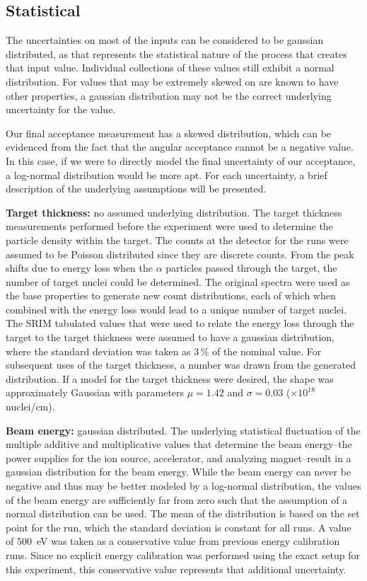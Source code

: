 \subsection{Statistical}

The uncertainties on most of the inputs can be considered to be gaussian
distributed, as that represents the statistical nature of the process
that creates that input value. Individual collections of these values
still exhibit a normal distribution. For values that may be extremely
skewed on are known to have other properties, a gaussian distribution
may not be the correct underlying uncertainty for the value.

Our final acceptance measurement has a skewed distribution, which can be
evidenced from the fact that the angular acceptance cannot be a negative
value. In this case, if we were to directly model the final uncertainty
of our acceptance, a log-normal distribution would be more apt. For each
uncertainty, a brief description of the underlying assumptions will be
presented.

\textbf{Target thickness:} no assumed underlying distribution. The
target thickness measurements performed before the experiment were used
to determine the particle density within the target. The counts at the
detector for the runs were assumed to be Poisson distributed since they
are discrete counts. From the peak shifts due to energy loss when the
$\alpha$ particles passed through the target, the number of target
nuclei could be determined. The original spectra were used as the base
properties to generate new count distributions, each of which when
combined with the energy loss would lead to a unique number of target
nuclei. The SRIM tabulated values that were used to relate the energy
loss through the target to the target thickness were assumed to have a
gaussian distribution, where the standard deviation was taken as 3\,\%
of the nominal value. For subsequent uses of the target thickness, a
number was drawn from the generated distribution. If a model for the
target thickness were desired, the shape was approximately Gaussian with
parameters $\mu = 1.42$ and $\sigma = 0.03$ ($\times 10^{18}$
nuclei/cm\squared{}).

\textbf{Beam energy:} gaussian distributed. The underlying statistical
fluctuation of the multiple additive and multiplicative values that
determine the beam energy\---{}the power supplies for the ion source,
accelerator, and analyzing magnet\---{}result in a gaussian distribution
for the beam energy. While the beam energy can never be negative and
thus may be better modeled by a log-normal distribution, the values of
the beam energy are sufficiently far from zero such that the assumption
of a normal distribution can be used. The mean of the distribution is
based on the set point for the run, which the standard deviation is
constant for all runs. A value of 500~eV was taken as a conservative
value from previous energy calibration runs. Since no explicit energy
calibration was performed using the exact setup for this experiment,
this conservative value represents that additional uncertainty.

